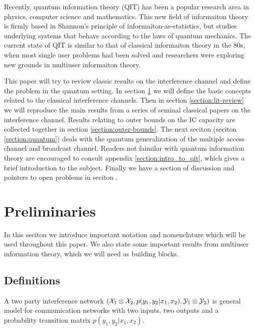\documentclass[aps,11pt,twoside,letterpaper]{article}
\begin{document}
    Recently, quantum information theory (QIT) has been a popular research area in physics,
    computer science and mathematics. This new field of informaiton theory is firmly based
    in Shannon's principle of informaiton-as-statistics, but studies underlying
    systems that behave according to the laws of quantum mechanics.
    The current state of QIT is similar to that of classical informaiton theory in the 80s,
    when most single user problems had been solved and researchers were exploring new
    grounds in multiuser informaiton theory.

    
    This paper will try to review classic results on the interference channel and
    define the problem in the quantum setting.
    In section \ref{Preliminaries} we will define the basic concepts related to
    the classical interference channels.
    Then in section \ref{section:lit-review} we will reproduce the main results
    from a series of seminal classical papers on the interference channel.
    Results relating to outer bounds on the IC capacity are collected together
    in section  \ref{section:outer-bounds}.
    The next seciton (seciton \ref{section:quantum}) deals with the quantum generalization of the
    multiple access channel and broadcast channel. 
    Readers not faimilar with quantum information theory are encouraged 
    to consult appendix \ref{section:intro_to_qit}, which gives a brief introduction to the subject.
    Finally we have a section of discussion and pointers to open problems in seciton  .

    
    
    
    
 \section{Preliminaries}  \label{Preliminaries} 

    In this seciton we introduce important notation and nomenclature which will
    be used throughout this paper.
    We also state some important results from multiuser information theory,
    which we will need as building blocks.

    \subsection{Definitions}
	
        \begin{definition}
            A two party interference network $({\cal X}_1 \otimes {\cal X}_2, p(y_1,y_2|x_1,x_2), {\cal Y}_1 \otimes {\cal Y}_2)$ 
            is general model for communication networks with two inputs, two outputs and a probability transition
            matrix $p(y_1,y_2|x_1,x_2)$.
        \end{definition}
        
\end{document}
